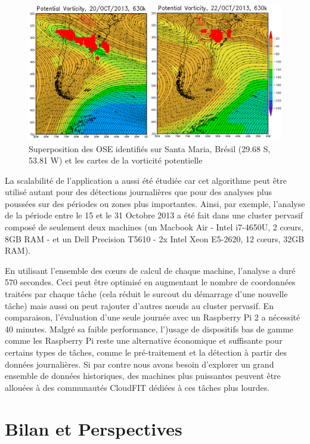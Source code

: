 \begin{figure}
	\centering
	\includegraphics[width=0.55\linewidth]{img/comparison2}
	\caption{Superposition des OSE identifiés sur Santa Maria, Brésil (29.68 S, 53.81 W)  et les cartes de la vorticité potentielle}\label{fig:comparison}
\end{figure}

La scalabilité de l'application a aussi été étudiée car cet algorithme peut être utilisé autant pour des détections journalières que pour des analyses plus poussées sur des périodes ou zones plus importantes. Ainsi, par exemple, l'analyse de la période entre le 15 et le 31 Octobre 2013 a été fait dans une cluster pervasif composé de seulement deux machines (un Macbook Air  - Intel i7-4650U, 2 c{\oe}urs, 8GB RAM -  et un Dell Precision T5610 - 2x Intel Xeon E5-2620, 12 c{\oe}urs, 32GB RAM). 

En utilisant l'ensemble des c{\oe}urs de calcul de chaque machine, l'analyse a duré 570 secondes. Ceci peut être optimisé en augmentant le nombre de coordonnées traitées par chaque tâche (cela réduit le surcout du démarrage d'une nouvelle tâche) mais aussi on peut rajouter d'autres n{\oe}uds au cluster pervasif. En comparaison, l'évaluation d'une seule journée avec un Raspberry Pi 2 a nécessité 40 minutes. Malgré sa faible performance, l')usage de dispositifs bas de gamme comme les Raspberry Pi reste une alternative économique et suffisante pour certains types de tâches, comme le pré-traitement et la détection à partir des données journalières. Si par contre nous avons besoin d'explorer un grand ensemble de données historiques, des machines plus puissantes peuvent être allouées à des communautés CloudFIT dédiées à ces tâches plus lourdes. 

\section{Bilan et Perspectives}